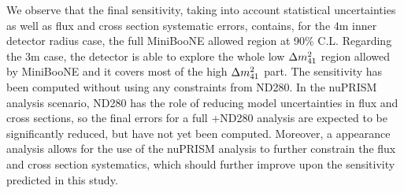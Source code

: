 We observe that the final sensitivity, taking into account statistical uncertainties as well as flux and cross section systematic errors, contains, for the 4m inner detector radius case,
the full MiniBooNE allowed 
region at 90\% C.L. Regarding the 3m case, the detector is able to 
explore the whole low $\Delta m^{2}_{41}$ region allowed by MiniBooNE and it covers most of the high 
$\Delta m^{2}_{41}$ part. The sensitivity has been computed without using any constraints from ND280. In the nuPRISM analysis scenario, ND280 has the role of reducing 
model uncertainties in flux and cross sections, so the final errors for a full \nuprism+ND280 analysis are expected to be significantly reduced, but have not yet been computed.
Moreover, a \nue appearance analysis allows for the use of the nuPRISM \numu analysis to further constrain 
the flux and cross section systematics, which should further improve upon the sensitivity
predicted in this study.


% 


